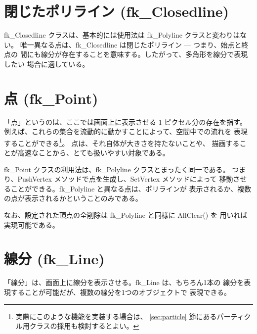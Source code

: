 \section{閉じたポリライン (fk\_Closedline)}
fk\_Closedline クラスは、基本的には使用法は fk\_Polyline クラスと変わりはない。
唯一異なる点は、fk\_Closedline は閉じたポリライン --- つまり、始点と終点の
間にも線分が存在することを意味する。したがって、多角形を線分で表現したい
場合に適している。

\section{点 (fk\_Point)}
「点」というのは、ここでは画面上に表示させる 1 ピクセル分の存在を指す。
例えば、これらの集合を流動的に動かすことによって、空間中での流れを
表現することができる\footnote{実際にこのような機能を実装する場合は、
\ref{sec:particle} 節にあるパーティクル用クラスの採用も検討するとよい。}。
点は、それ自体が大きさを持たないことや、
描画することが高速なことから、とても扱いやすい対象である。

fk\_Point クラスの利用法は、fk\_Polyline クラスとまったく同一である。
つまり、PushVertex メソッドで点を生成し、SetVertex メソッドによって
移動させることができる。fk\_Polyline と異なる点は、ポリラインが
表示されるか、複数の点が表示されるかということのみである。

なお、設定された頂点の全削除は fk\_Polyline と同様に AllClear() を
用いれば実現可能である。

\section{線分 (fk\_Line)}
「線分」は、画面上に線分を表示させる。fk\_Line は、もちろん1本の
線分を表現することが可能だが、複数の線分を1つのオブジェクトで
表現できる。

